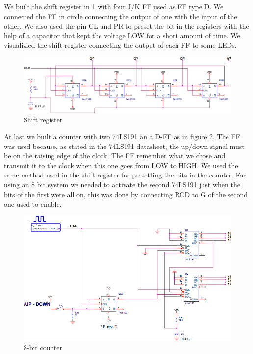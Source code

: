 We built the shift register in \ref{shift_reg} with four J/K FF used as FF type D. We connected the FF in circle connecting the output of one with the input of the other. We also used the pin CL and PR to preset the bit in the registers with the help of a capacitor that kept the voltage LOW for a short amount of time. We visualizied the shift register connecting the output of each FF to some LEDs.
\begin{figure}[H]
\centering
\includegraphics[width=.7\textwidth]{11/shift_reg.png}
\caption{Shift register}\label{shift_reg}

\end{figure}
At last we built a counter with two 74LS191 an a D-FF as in figure \ref{count}. The FF was used because, as stated in the 74LS191 datasheet, the up/down signal must be on the raising edge of the clock. The FF remember what we chose and transmit it to the clock when this one goes from LOW to HIGH. We used the same method used in the shift register for presetting the bits in the counter. For using an 8 bit system we needed to activate the second 74LS191 just when the bits of the first were all on, this was done by connecting RCD to G of the second one used to enable.
\begin{figure}[H]
\centering
\includegraphics[width=.7\textwidth]{11/count.png}
\caption{8-bit counter}\label{count}
\end{figure}


